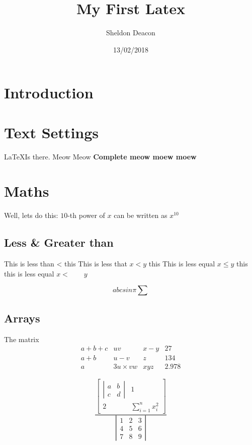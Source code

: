 \documentclass[10pt]{article} %
\author{Sheldon Deacon}
\title{My First Latex}
\date{13/02/2018}
\begin{document}
\maketitle

\section*{Introduction} %

\section{Text Settings}

\LaTeX \space Is there.
Meow Meow \bf{Complete} meow moew moew 

\section{Maths}

Well, lets do this: $10$-th power of $x$ can be written as $x^{10}$
 
\subsection{Less \& Greater than}
This is less than < this  \newline
This is less that $x < y$ this\newline
This is less equal $x \leq y$ this\newline
this is less equal $x <\qquad y$


\begin{equation}
 abc sin \pi \sum
\end{equation}

\subsection{Arrays}
The matrix \[
\begin{array}{clcr}
a+b+c & uv & x-y & 27 \\
a+b & u-v & z & 134 \\
a & 3u\times vw & xyz
& 2.978
\end{array} \]

\[\frac{
	\left[\begin{array}{cc}
	\left|\begin{array}{cc}
	a & b \\ c & d
	\end{array}\right| & 1 \\
	2 & \sum_{i=1}^{n}x_{i}^{2}
	\end{array}\right]}
	{\left|
	\begin{array}{ccc}
	1 & 2 & 3 \\
	4 & 5 & 6 \\
	7 & 8 & 9
	\end{array}\right|}\]
\end{document}
